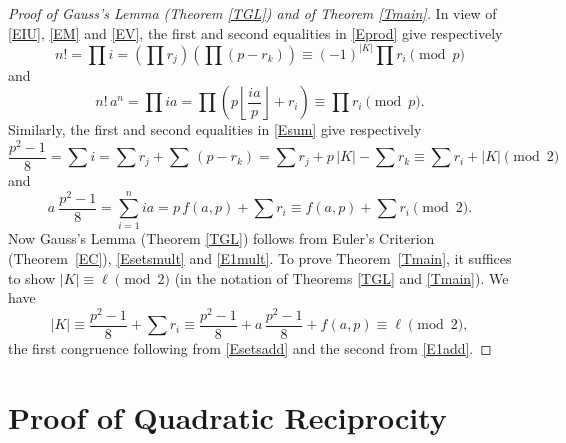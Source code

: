 \documentclass[12pt,letterpaper]{article}
\begin{document}
\begin{proof}[Proof of Gauss's Lemma (Theorem \ref{TGL}) and of Theorem \ref{Tmain}]
In view of \eqref{EIU}, \eqref{EM} and \eqref{EV}, the first and second equalities in \eqref{Eprod} give respectively  
\begin{equation}\label{Esetsmult} 
n!=\prod i=\left(\prod r_j\right)\left(\prod (p-r_k)\right)\equiv(-1)^{|K|}\prod r_i\pmod{p} 
\end{equation} 
and 
\begin{equation}\label{E1mult} 
n!\,a^n=\prod ia=\prod\left(p\left\lfloor\frac{ia}p\right\rfloor+r_i\right)\equiv\prod r_i\pmod{p}. 
\end{equation} 
Similarly, the first and second equalities in \eqref{Esum} give respectively 
\begin{equation}\label{Esetsadd} 
\frac{p^2-1}8=\sum i=\sum r_j+\sum\,(p-r_k)=\sum r_j+p\,|K|-\sum r_k\equiv\sum r_i+|K|\pmod{2} 
\end{equation} 
and 
\begin{equation}\label{E1add} 
a\ \frac{p^2-1}8=\sum_{i=1}^nia=p\,f(a,p)+\sum r_i\equiv f(a,p)+\sum r_i\pmod{2}. 
\end{equation} 
Now Gauss's Lemma (Theorem \ref{TGL}) follows from Euler's Criterion (Theorem~\ref{EC}), \eqref{Esetsmult} and \eqref{E1mult}. To prove Theorem~\ref{Tmain}, it suffices to show \(|K|\equiv\ell\pmod{2}\) (in the notation of Theorems \ref{TGL} and \ref{Tmain}). We have 
\[
|K|\equiv\frac{p^2-1}8+\sum r_i\equiv\frac{p^2-1}8+a\,\frac{p^2-1}8+f(a,p)\equiv\ell\pmod{2},
\] 
the first congruence following from \eqref{Esetsadd} and the second from \eqref{E1add}. 
\end{proof} 

\section{Proof of Quadratic Reciprocity}%
\end{document}
